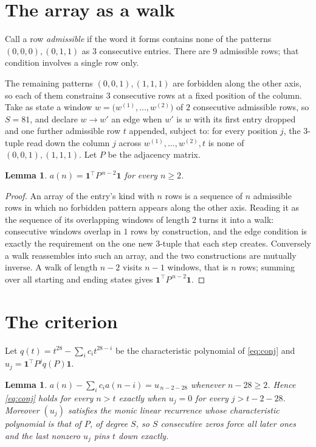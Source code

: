 \documentclass[11pt,a4paper]{article}
\theoremstyle{plain}
\newtheorem{lemma}[theorem]{Lemma}
\theoremstyle{definition}
\begin{document}
\section{The array as a walk}

Call a row \emph{admissible} if the word it forms contains none of the patterns
$(0,0,0), (0,1,1)$ as $3$ consecutive entries. There are $9$ admissible rows; that condition
involves a single row only.

The remaining patterns $(0,0,1), (1,1,1)$ are forbidden along the other axis, so each of them
constrains $3$ consecutive rows at a fixed position of the column. Take as state a
window $w=\bigl(w^{(1)},\dots,w^{(2)}\bigr)$ of $2$ consecutive admissible
rows, so $S=81$, and declare $w\to w'$ an edge when $w'$ is $w$ with its first entry
dropped and one further admissible row $t$ appended, subject to: for every position
$j$, the $3$-tuple read down the column $j$ across $w^{(1)},\dots,w^{(2)},t$
is none of $(0,0,1), (1,1,1)$. Let $P$ be the adjacency matrix.

\begin{lemma}\label{lem:walk}
$a(n)=\mathbf{1}^{\!\top}P^{\,n-2}\mathbf{1}$ for every $n\ge2$.
\end{lemma}

\begin{proof}
An array of the entry's kind with $n$ rows is a sequence of $n$ admissible rows in
which no forbidden pattern appears along the other axis. Reading it as the sequence of its
overlapping windows of length $2$ turns it into a walk: consecutive windows overlap in
$1$ rows by construction, and the edge condition is exactly the requirement on the one
new $3$-tuple that each step creates. Conversely a walk reassembles into such an array,
and the two constructions are mutually inverse. A walk of length $n-2$ visits $n-1$
windows, that is $n$ rows; summing over all starting and ending states gives
$\mathbf{1}^{\!\top}P^{\,n-2}\mathbf{1}$.
\end{proof}

\section{The criterion}

Let $q(t)=t^{28}-\sum_i c_i t^{28-i}$ be the characteristic polynomial of
\eqref{eq:conj} and $u_j=\mathbf{1}^{\!\top}P^{j}q(P)\mathbf{1}$.

\begin{lemma}\label{lem:crit}
$a(n)-\sum_i c_i a(n-i)=u_{\,n-2-28}$ whenever $n-28\ge2$. Hence
\eqref{eq:conj} holds for every $n>t$ exactly when $u_j=0$ for every
$j>t-2-28$. Moreover $(u_j)$ satisfies the monic linear recurrence whose
characteristic polynomial is that of $P$, of degree $S$, so $S$ consecutive zeros force all
later ones and the last nonzero $u_j$ pins $t$ down exactly.
\end{lemma}
\end{document}
